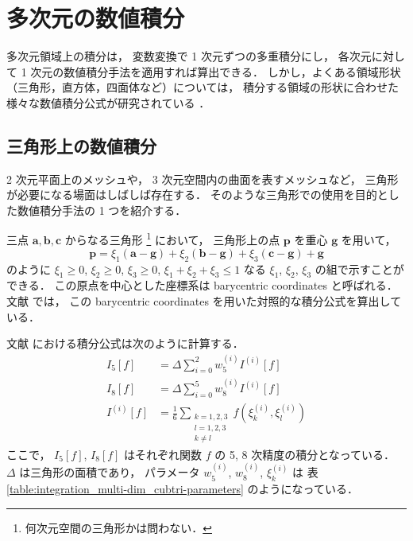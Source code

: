 %

\chapter{多次元の数値積分}

多次元領域上の積分は，
変数変換で 1 次元ずつの多重積分にし，
各次元に対して 1 次元の数値積分手法を適用すれば算出できる．
しかし，よくある領域形状（三角形，直方体，四面体など）については，
積分する領域の形状に合わせた様々な数値積分公式が研究されている
\cite{Cools1993}．

\section{三角形上の数値積分}

2 次元平面上のメッシュや，
3 次元空間内の曲面を表すメッシュなど，
三角形が必要になる場面はしばしば存在する．
そのような三角形での使用を目的とした数値積分手法の 1 つを紹介する．

三点 $\bm{a}, \bm{b}, \bm{c}$ からなる三角形
\footnote{何次元空間の三角形かは問わない．}
において，
三角形上の点 $\bm{p}$ を重心 $\bm{g}$ を用いて，
\begin{equation}
    \bm{p} = \xi_1 (\bm{a} - \bm{g}) + \xi_2 (\bm{b} - \bm{g}) + \xi_3 (\bm{c} - \bm{g}) + \bm{g}
\end{equation}
のように
$\xi_1 \ge 0$,
$\xi_2 \ge 0$,
$\xi_3 \ge 0$,
$\xi_1 + \xi_2 + \xi_3 \le 1$
なる $\xi_1$, $\xi_2$, $\xi_3$ の組で示すことができる．
この原点を中心とした座標系は barycentric coordinates と呼ばれる．
文献 \cite{Laurie1982} では，
この barycentric coordinates を用いた対照的な積分公式を算出している．

文献 \cite{Laurie1982} における積分公式は次のように計算する．
\begin{align}
    I_5[f]     & = \Delta \sum_{i=0}^2 w_5^{(i)} I^{(i)}[f] \\
    I_8[f]     & = \Delta \sum_{i=0}^5 w_8^{(i)} I^{(i)}[f] \\
    I^{(i)}[f] & = \frac{1}{6} \sum_{\substack{k = 1, 2, 3  \\ l = 1, 2, 3 \\ k \neq l}}
    f(\xi_k^{(i)}, \xi_l^{(i)})
\end{align}
ここで，
$I_5[f]$, $I_8[f]$ はそれぞれ関数 $f$ の 5, 8 次精度の積分となっている．
$\Delta$ は三角形の面積であり，
パラメータ $w_5^{(i)}$, $w_8^{(i)}$, $\xi_k^{(i)}$ は
表 \ref{table:integration_multi-dim_cubtri-parameters} のようになっている．

